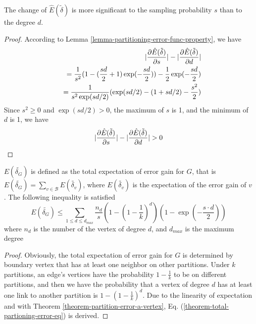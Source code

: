 \documentclass{sig-alternate-2013}
\begin{document}
\begin{lemma}\label{lemma-expection-error-significant}
The change of $\hat{E}(\tilde\delta)$ is more significant to the sampling probability $s$ than to the degree $d$.
\end{lemma}
\begin{proof}
According to Lemma \ref{lemma-partitioning-error-func-property}, we have
\begin{eqnarray}
&&|\frac{\partial \hat{E}(\tilde\delta) }{\partial s}| - |\frac{\partial \hat{E}(\tilde\delta)}{\partial d}| \notag \\
&&=\frac{1}{s^2}(1-(\frac{sd}{2} + 1)\exp(-\frac{sd}{2})) - \frac{1}{2}\exp(-\frac{sd}{2}) \notag \\
&&=\frac{1}{s^2 \exp(sd/2)}(\exp(sd/2)-(1+sd/2)-\frac{s^2}{2})  \notag \end{eqnarray}
Since $s^2 \geq 0$ and $\exp(sd/2) > 0$, the maximum of $s$ is 1, and the minimum of $d$ is 1, we have
\begin{eqnarray}
|\frac{\partial \hat{E}(\tilde\delta)}{\partial s}| - |\frac{\partial \hat{E}(\tilde\delta) }{\partial d}| > 0 \notag
\end{eqnarray}
\end{proof}

\begin{theorem}\label{theorm-total-partioning-error}
$E(\tilde{\delta_G})$ is defined as the total expectation of error gain for $G$, that is $E(\tilde{\delta_G}) = \sum_{v \in \mathcal{B}} {E(\tilde{\delta_v})}$, where $E(\tilde{\delta_v})$ is the expectation of the error gain of $v$. The following inequality is satisfied
\begin{equation}\label{theorem-total-partioning-error-eq}
E(\tilde{\delta_G}) \leq \sum_{1\leq d\leq d_{max}} {\frac{n_d}{s} (1-(1-\frac{1}{k})^d) (1-\exp(-\frac{s\cdot d}{2}))}
\end{equation}
where $n_d$ is the number of the vertex of degree $d$, and $d_{max}$ is the maximum degree
\end{theorem}
\begin{proof}
Obviously, the total expectation of error gain for $G$  is determined by boundary vertex that has at least one neighbor on other partitions. Under $k$ partitions, an edge's  vertices have the probability $1-\frac{1}{k}$ to be on different partitions, and then we have the probability that a vertex of degree $d$ has at least one link to another partition is $1-(1-\frac{1}{k})^d$. Due to the linearity of expectation and with Theorem \ref{theorem-partition-error-a-vertex}, Eq. (\ref{theorem-total-partioning-error-eq}) is derived.
\end{proof}
\end{document}
